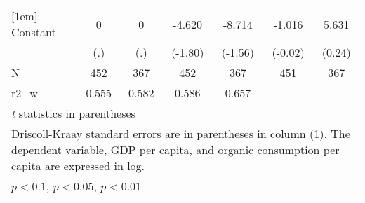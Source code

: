 \begin{table}[htbp]
\begin{tabular}{l*{6}{c}}
[1em]
Constant            &           0         &           0         &      -4.620\sym{*}  &      -8.714         &      -1.016         &       5.631         \\
                    &         (.)         &         (.)         &     (-1.80)         &     (-1.56)         &     (-0.02)         &      (0.24)         \\
\hline
N                   &         452         &         367         &         452         &         367         &         451         &         367         \\
r2\_w                &       0.555         &       0.582         &       0.586         &       0.657         &                     &                     \\
\hline\hline
\multicolumn{7}{l}{\footnotesize \textit{t} statistics in parentheses}\\
\multicolumn{7}{l}{\footnotesize Driscoll-Kraay standard errors are in parentheses in column (1). The dependent variable, GDP per capita, and organic consumption per capita are expressed in log.}\\
\multicolumn{7}{l}{\footnotesize \sym{*} \(p<0.1\), \sym{**} \(p<0.05\), \sym{***} \(p<0.01\)}\\
\end{tabular}
\end{table}
